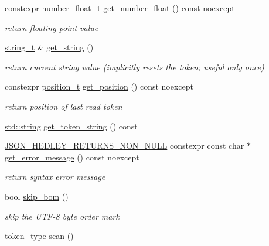 \begin{DoxyCompactItemize}
constexpr \mbox{\hyperlink{classnlohmann_1_1detail_1_1lexer_aa7f9e7b2bcd311fb86e2da43761a6619}{number\+\_\+float\+\_\+t}} \mbox{\hyperlink{classnlohmann_1_1detail_1_1lexer_ac013af35a21e9387993b19da5b3e0ae2}{get\+\_\+number\+\_\+float}} () const noexcept
\begin{DoxyCompactList}\small\item\em return floating-\/point value \end{DoxyCompactList}\item 
\mbox{\hyperlink{classnlohmann_1_1detail_1_1lexer_ab63d35c658887592a4b09ad26eb4c795}{string\+\_\+t}} \& \mbox{\hyperlink{classnlohmann_1_1detail_1_1lexer_a54aa290ff2f60218a8f35f1ebf81666d}{get\+\_\+string}} ()
\begin{DoxyCompactList}\small\item\em return current string value (implicitly resets the token; useful only once) \end{DoxyCompactList}\item 
constexpr \mbox{\hyperlink{structnlohmann_1_1detail_1_1position__t}{position\+\_\+t}} \mbox{\hyperlink{classnlohmann_1_1detail_1_1lexer_abf5143501435f9f79898c1ff238c2622}{get\+\_\+position}} () const noexcept
\begin{DoxyCompactList}\small\item\em return position of last read token \end{DoxyCompactList}\item 
\mbox{\hyperlink{namespacenlohmann_1_1detail_a1ed8fc6239da25abcaf681d30ace4985ab45cffe084dd3d20d928bee85e7b0f21}{std\+::string}} \mbox{\hyperlink{classnlohmann_1_1detail_1_1lexer_a4aef7e72e539be04e139c34872421f2a}{get\+\_\+token\+\_\+string}} () const
\item 
\mbox{\hyperlink{json_8hpp_a5f2aaec3b681d0a72f7d6e90b70cdcd1}{J\+S\+O\+N\+\_\+\+H\+E\+D\+L\+E\+Y\+\_\+\+R\+E\+T\+U\+R\+N\+S\+\_\+\+N\+O\+N\+\_\+\+N\+U\+LL}} constexpr const char $\ast$ \mbox{\hyperlink{classnlohmann_1_1detail_1_1lexer_a3cead908f797ffa091bb67e90985739d}{get\+\_\+error\+\_\+message}} () const noexcept
\begin{DoxyCompactList}\small\item\em return syntax error message \end{DoxyCompactList}\item 
bool \mbox{\hyperlink{classnlohmann_1_1detail_1_1lexer_a709afd52def2e258dac0b8a67dc4ea26}{skip\+\_\+bom}} ()
\begin{DoxyCompactList}\small\item\em skip the U\+T\+F-\/8 byte order mark \end{DoxyCompactList}\item 
\mbox{\hyperlink{classnlohmann_1_1detail_1_1lexer_a3f313cdbe187cababfc5e06f0b69b098}{token\+\_\+type}} \mbox{\hyperlink{classnlohmann_1_1detail_1_1lexer_aac3041cd2b9291e64fee38db422863c9}{scan}} ()
\end{DoxyCompactItemize}

